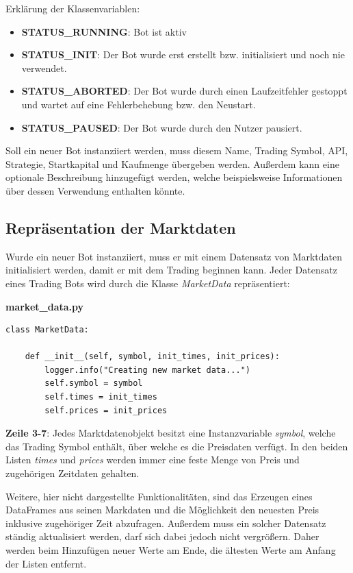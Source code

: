 \documentclass[oneside]{ausarbeitung}
\begin{document}
Erklärung der Klassenvariablen:
\begin{itemize}
	\item \textbf{STATUS\_RUNNING}: Bot ist aktiv
	\item \textbf{STATUS\_INIT}: Der Bot wurde erst erstellt bzw. initialisiert
		und noch nie verwendet.
	\item \textbf{STATUS\_ABORTED}: Der Bot wurde durch einen Laufzeitfehler
		gestoppt und wartet auf eine Fehlerbehebung bzw. den Neustart.
	\item \textbf{STATUS\_PAUSED}: Der Bot wurde durch den Nutzer pausiert.
\end{itemize}

Soll ein neuer Bot instanziiert werden, muss diesem Name, Trading Symbol, API, Strategie, Startkapital und Kaufmenge übergeben werden. Außerdem kann eine optionale Beschreibung hinzugefügt werden, welche beispielsweise Informationen über dessen Verwendung enthalten könnte.

\subsection{Repräsentation der Marktdaten}
\label{sub:repräsentation_der_marktdaten}

Wurde ein neuer Bot instanziiert, muss er mit einem Datensatz von Marktdaten initialisiert werden, damit er mit dem Trading beginnen kann. Jeder Datensatz eines Trading Bots wird durch die Klasse \textit{MarketData} repräsentiert:

\lstset{language=Python}
\lstset{frame=lines}
\lstset{basicstyle=\footnotesize}
\textbf{market\_data.py}
\begin{lstlisting}
class MarketData:

	def __init__(self, symbol, init_times, init_prices):
		logger.info("Creating new market data...")
		self.symbol = symbol
		self.times = init_times
		self.prices = init_prices
\end{lstlisting}

\textbf{Zeile 3-7}: Jedes Marktdatenobjekt besitzt eine Instanzvariable \textit{symbol}, welche das Trading Symbol enthält, über welche es die Preisdaten verfügt. In den beiden Listen \textit{times} und \textit{prices} werden immer eine feste Menge von Preis und zugehörigen Zeitdaten gehalten.

Weitere, hier nicht dargestellte Funktionalitäten, sind das Erzeugen eines DataFrames aus seinen Markdaten und die Möglichkeit den neuesten Preis inklusive zugehöriger Zeit abzufragen. Außerdem muss ein solcher Datensatz ständig aktualisiert werden, darf sich dabei jedoch nicht vergrößern. Daher werden beim Hinzufügen neuer Werte am Ende, die ältesten Werte am Anfang der Listen entfernt.
\end{document}
